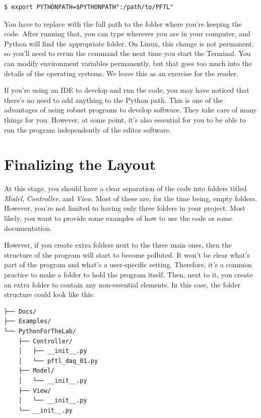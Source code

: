 \begin{verbatim}
$ export PYTHONPATH=$PYTHONPATH":/path/to/PFTL"
\end{verbatim}

You have to replace  with the full path to the folder where you're keeping the code. After running that, you can type  wherever you are in your computer, and Python will find the appropriate folder. On Linux, this change is not permanent, so you'll need to rerun the command the next time you start the Terminal. You can modify environment variables permanently, but that goes too much into the details of the operating systems. We leave this as an exercise for the reader.

If you're using an IDE to develop and run the code, you may have noticed that there's no need to add anything to the Python path. This is one of the advantages of using robust programs to develop software. They take care of many things for you. However, at some point, it's also essential for you to be able to run the program independently of the editor software.

\section{Finalizing the Layout}\label{sec:final-layout}
At this stage, you should have a clear separation of the code into folders titled \emph{Model}, \emph{Controller}, and \emph{View}. Most of these are, for the time being, empty folders. However, you're not limited to having only three folders in your project. Most likely, you want to provide some examples of how to use the code or some documentation.

However, if you create extra folders next to the three main ones, then the structure of the program will start to become polluted. It won't be clear what's part of the program and what's a user-specific setting. Therefore, it's a common practice to make a folder to hold the program itself. Then, next to it, you create an extra folder to contain any non-essential elements. In this case, the folder structure could look like this:

\begin{verbatim}
├── Docs/
├── Examples/
└── PythonForTheLab/
    ├── Controller/
    │   ├── __init__.py
    │   └── pftl_daq_01.py
    ├── Model/
    │   └── __init__.py
    ├── View/
    │   └── __init__.py
    └── __init__.py
\end{verbatim}

